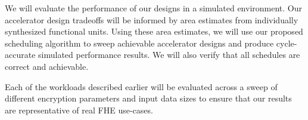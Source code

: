 We will evaluate the performance of our designs in a simulated environment.
Our accelerator design tradeoffs will be informed by area estimates from
individually synthesized functional units. Using these area estimates,
we will use our proposed scheduling algorithm to sweep achievable
accelerator designs and produce cycle-accurate simulated performance results.
We will also verify that all schedules are correct and achievable.

Each of the workloads described earlier 
will be evaluated across a sweep of different
encryption parameters and input data sizes to ensure that our results are
representative of real FHE use-cases.

